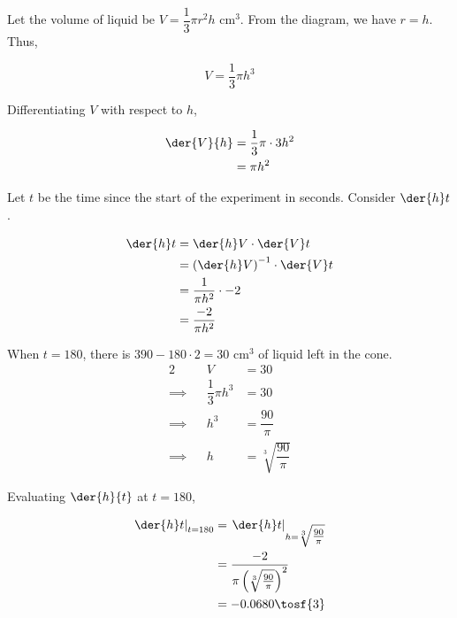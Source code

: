 \documentclass{jhwhw}
\begin{document}
        Let the volume of liquid be $V = \dfrac13 \pi r^2 h$ cm$^3$. From the diagram, we have $r = h$. Thus,

        \begin{equation*}
            V = \dfrac13 \pi h^3
        \end{equation*}

        Differentiating $V$ with respect to $h$,

        \begin{align*}
            \der{V}{h}&= \dfrac13 \pi \cdot 3 h^2\\
            &= \pi h^2
        \end{align*}

        Let $t$ be the time since the start of the experiment in seconds. Consider $\der{h}t$.

        \begin{align*}
            \der{h}t &= \der{h}V \cdot \der{V}t\\
            &= \left(\der{h}V\right)^{-1} \cdot \der{V}t\\
            &= \dfrac1{\pi h^2} \cdot -2\\
            &= \dfrac{-2}{\pi h^2}
        \end{align*}

        When $t = 180$, there is $390 - 180\cdot2 = 30$ cm$^3$ of liquid left in the cone.
        \begin{alignat*}{2}
            &&V &= 30\\
            \implies&&\dfrac13 \pi h^3 &= 30\\
            \implies&&h^3 &= \dfrac{90}{\pi}\\
            \implies&&h &= \sqrt[3]{\dfrac{90}{\pi}}
        \end{alignat*}

        Evaluating $\der{h}{t}$ at $t =180$,

        \begin{align*}
            \left.\der{h}t\right|_{t = 180} &= \left.\der{h}t\right|_{h = \sqrt[3]{\tfrac{90}{\pi}}}\\
            &= \dfrac{-2}{\pi \left(\sqrt[3]{\tfrac{90}{\pi}}\right)^2}\\
            &= -0.0680 \tosf{3}
        \end{align*}

\end{document}

